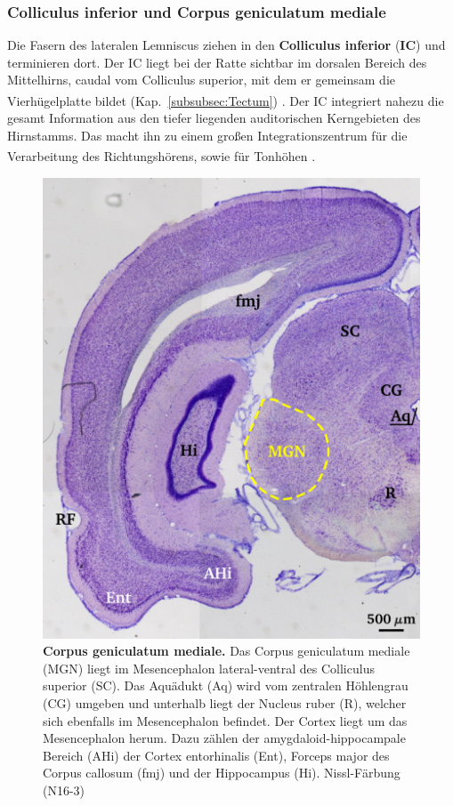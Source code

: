 \documentclass[12pt,a4paper,pdftex]{article}
\begin{document}
\newpage
\subsubsection*{Colliculus inferior und Corpus geniculatum mediale}

Die Fasern des lateralen Lemniscus ziehen in den \textbf{Colliculus inferior} (\textbf{IC})  und terminieren dort. Der IC liegt bei der Ratte sichtbar im dorsalen Bereich des Mittelhirns, caudal vom Colliculus superior, mit dem er gemeinsam die Vierhügelplatte bildet (Kap.~\ref{subsubsec:Tectum}) \textsuperscript{\cite[29]{paxinos2014rat}}. 
Der IC integriert nahezu die gesamt Information aus den tiefer liegenden auditorischen Kerngebieten des Hirnstamms. Das macht ihn zu einem großen Integrationszentrum für die Verarbeitung des Richtungshörens, sowie für Tonhöhen \textsuperscript{\cite[29]{paxinos2014rat}}.

\begin{figure}[H]
    \centering
    \includegraphics{pictures/auditory/MG.png}
    \caption[Corpus geniculatum mediale]{\textbf{Corpus geniculatum mediale.} Das Corpus geniculatum mediale (MGN) liegt im Mesencephalon lateral-ventral des Colliculus superior (SC). Das Aquädukt (Aq) wird vom zentralen Höhlengrau (CG) umgeben und unterhalb liegt der Nucleus ruber (R), welcher sich ebenfalls im Mesencephalon befindet. Der Cortex liegt um das Mesencephalon herum. Dazu zählen der amygdaloid-hippocampale Bereich (AHi) der Cortex entorhinalis (Ent), Forceps major des Corpus callosum (fmj) und der Hippocampus (Hi). Nissl-Färbung (N16-3)}
    \label{fig:MG}
\end{figure}
\end{document}
